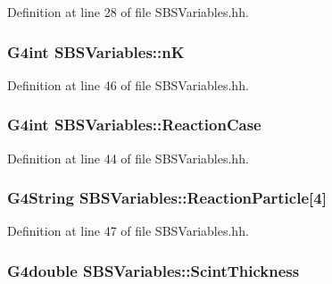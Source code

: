 Definition at line 28 of file S\-B\-S\-Variables.\-hh.

\hypertarget{class_s_b_s_variables_af10311ab957c982d3916c1d838162786}{
\subsubsection[{n\-K}]{\setlength{\rightskip}{0pt plus 5cm}G4int S\-B\-S\-Variables\-::n\-K}}\label{class_s_b_s_variables_af10311ab957c982d3916c1d838162786}


Definition at line 46 of file S\-B\-S\-Variables.\-hh.

\hypertarget{class_s_b_s_variables_ab416f097e1de50c1bbc462d5908f6b5d}{
\subsubsection[{Reaction\-Case}]{\setlength{\rightskip}{0pt plus 5cm}G4int S\-B\-S\-Variables\-::\-Reaction\-Case}}\label{class_s_b_s_variables_ab416f097e1de50c1bbc462d5908f6b5d}


Definition at line 44 of file S\-B\-S\-Variables.\-hh.

\hypertarget{class_s_b_s_variables_a0920a3979aa1c25c139d6a0f13669b00}{
\subsubsection[{Reaction\-Particle}]{\setlength{\rightskip}{0pt plus 5cm}G4\-String S\-B\-S\-Variables\-::\-Reaction\-Particle\mbox{[}4\mbox{]}}}\label{class_s_b_s_variables_a0920a3979aa1c25c139d6a0f13669b00}


Definition at line 47 of file S\-B\-S\-Variables.\-hh.

\hypertarget{class_s_b_s_variables_abb259dd81111497ec4db2fe9199f2d01}{
\subsubsection[{Scint\-Thickness}]{\setlength{\rightskip}{0pt plus 5cm}G4double S\-B\-S\-Variables\-::\-Scint\-Thickness}}\label{class_s_b_s_variables_abb259dd81111497ec4db2fe9199f2d01}


